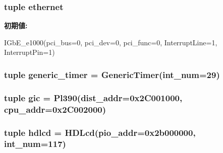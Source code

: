 \label{classRealView_1_1VExpress__EMM_aca2e883cdc9c636e4500344d5892f6c9}
\hypertarget{classRealView_1_1VExpress__EMM_abaa800db2392e16f3bdb03d92660a10c}{
\subsubsection[{ethernet}]{\setlength{\rightskip}{0pt plus 5cm}tuple {\bf ethernet}}}
\label{classRealView_1_1VExpress__EMM_abaa800db2392e16f3bdb03d92660a10c}
{\bfseries 初期値:}
\begin{DoxyCode}
IGbE_e1000(pci_bus=0, pci_dev=0, pci_func=0,
                          InterruptLine=1, InterruptPin=1)
\end{DoxyCode}
\hypertarget{classRealView_1_1VExpress__EMM_a52191b117ee0056fa00602ded59a5838}{
\subsubsection[{generic\_\-timer}]{\setlength{\rightskip}{0pt plus 5cm}tuple {\bf generic\_\-timer} = {\bf GenericTimer}(int\_\-num=29)}}
\label{classRealView_1_1VExpress__EMM_a52191b117ee0056fa00602ded59a5838}
\hypertarget{classRealView_1_1VExpress__EMM_a40243beb62d217c3a9e35801ae739fd0}{
\subsubsection[{gic}]{\setlength{\rightskip}{0pt plus 5cm}tuple {\bf gic} = {\bf Pl390}(dist\_\-addr=0x2C001000, cpu\_\-addr=0x2C002000)}}
\label{classRealView_1_1VExpress__EMM_a40243beb62d217c3a9e35801ae739fd0}
\hypertarget{classRealView_1_1VExpress__EMM_a8848fedc605f9c4448e17b5833175525}{
\subsubsection[{hdlcd}]{\setlength{\rightskip}{0pt plus 5cm}tuple {\bf hdlcd} = {\bf HDLcd}(pio\_\-addr=0x2b000000, int\_\-num=117)}}
